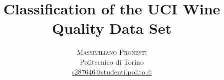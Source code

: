 \documentclass[twoside]{article}
\title{\vspace{-15mm}\fontsize{24pt}{10pt}\selectfont\textbf{Classification of the UCI Wine Quality Data Set}} %
\author{
	\large
	\textsc{Massimiliano Pronesti}\\[2mm] %
	\normalsize Politecnico di Torino \\ %
	\normalsize \href{mailto:s287646@studenti.polito.it}{s287646@studenti.polito.it} %
	\vspace{-5mm}
}
\date{}
\begin{document}
	
	\maketitle %
	

	\begin{multicols}{2} %
		
		
		
		
		

	\end{multicols}
	
\end{document}
